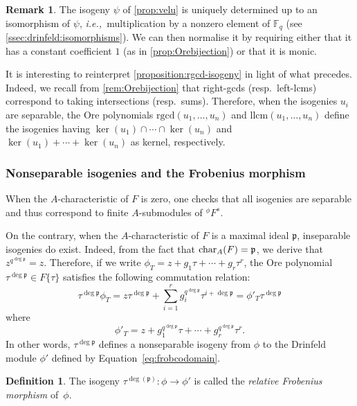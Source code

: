 \documentclass[11pt]{article}
\theoremstyle{definition}
\newtheorem{definition}[theorem]{Definition}
\newtheorem{remark}[theorem]{Remark}
\newcommand\Fq{\mathbb{F}_q}
\newcommand\Acar{\text{\rm char}_A}
\newcommand{\p}{\mathfrak{p}}
\newcommand{\pp}{\mathfrak{p}}
\newcommand{\phiact}[1]{{}^\phi\! #1}
\newcommand{\Ftau}{F\{\tau\}}
\newcommand{\rgcd}{\mathrm{rgcd}}
\newcommand{\llcm}{\mathrm{llcm}}
\newcommand{\ie}{\textit{i.e.,~}}
\begin{document}
\begin{remark}
The isogeny $\psi$ of \cref{prop:velu} is uniquely determined up to an isomorphism of $\psi$, \ie multiplication
by a nonzero element of $\Fq$ (see \cref{ssec:drinfeld:isomorphisms}).
We can then normalise it by requiring either that it has a constant
coefficient $1$ (as in \cref{prop:Orebijection}) or that
it is monic.
\end{remark}

It is interesting to reinterpret 
\cref{proposition:rgcd-isogeny} in light of what precedes. Indeed, we 
recall from \cref{rem:Orebijection} that right-gcds (resp.~left-lcms) 
correspond to taking intersections (resp.~sums). Therefore, when the 
isogenies $u_i$ are separable, the Ore polynomials $\rgcd(u_1, \dots, 
u_n)$ and $\llcm(u_1, \ldots, u_n)$ define the isogenies having 
$\ker(u_1) \cap \cdots \cap \ker(u_n)$ and $\ker(u_1) + \cdots + 
\ker(u_n)$ as kernel, respectively.

\subsubsection{Nonseparable isogenies and the Frobenius morphism}
\label{sssec:Frobenius}

When the $A$-characteristic of $F$ is zero, one checks that all isogenies
are separable and thus correspond to finite $A$-submodules of $\phiact{F^s}$.

On the contrary, when the $A$-characteristic of $F$ is a maximal ideal
$\pp$, inseparable isogenies do exist. Indeed, from the fact that 
$\Acar(F) = \pp$, we derive that $z^{q^{\deg\pp}} = z$. Therefore, 
if we write $\phi_T = z + g_1 \tau + \cdots + g_r \tau^r$, the Ore polynomial
$\tau^{\deg\pp} \in \Ftau$ satisfies the following commutation relation:
\[
  \tau^{\deg\pp} \phi_T
  = z \tau^{\deg\pp} + \sum_{i = 1}^r g_i^{q^{\deg\pp}} \tau^{i + \deg\pp}
  = \phi'_T \tau^{\deg\pp}
\]
where
\begin{equation}
\label{eq:frobcodomain}
  \phi'_T = z + g_1^{q^{\deg\pp}} \tau + \cdots + g_r^{q^{\deg\pp}} \tau^r.
\end{equation}
In other words, $\tau^{\deg\pp}$ defines a nonseparable isogeny from 
$\phi$ to the Drinfeld module $\phi'$ defined by
Equation~\eqref{eq:frobcodomain}.

\begin{definition}
\label{def:relativeFrobenius}
  The isogeny $\tau^{\deg(\p)}:\phi\to\phi'$ is called the 
  \emph{relative Frobenius morphism} of~$\phi$.
\end{definition}
\end{document}

